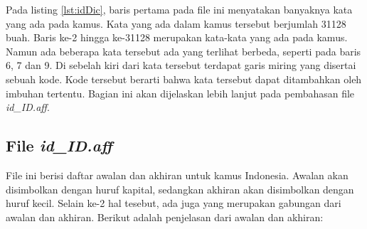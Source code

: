 Pada listing \ref{lst:idDic}, baris pertama pada file ini menyatakan banyaknya kata yang ada pada kamus. Kata yang ada dalam kamus tersebut berjumlah 31128 buah. Baris ke-2 hingga ke-31128 merupakan kata-kata yang ada pada kamus. Namun ada beberapa kata tersebut ada yang terlihat berbeda, seperti pada baris 6, 7 dan 9. Di sebelah kiri dari kata tersebut terdapat garis miring yang disertai sebuah kode. Kode tersebut berarti bahwa kata tersebut dapat ditambahkan oleh imbuhan tertentu. Bagian ini akan dijelaskan lebih lanjut pada pembahasan file \textit{id\_ID.aff}.

\subsection{File \textit{id\_ID.aff}}

File ini berisi daftar awalan dan akhiran untuk kamus Indonesia. Awalan akan disimbolkan dengan huruf kapital, sedangkan akhiran akan disimbolkan dengan huruf kecil. Selain ke-2 hal tesebut, ada juga yang merupakan gabungan dari awalan dan akhiran. Berikut adalah penjelasan dari awalan dan akhiran:

